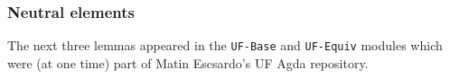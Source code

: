 \subsubsection{Neutral elements}\label{neutral-elements}
The next three lemmas appeared in the \texttt{UF-Base} and \texttt{UF-Equiv} modules which were (at one time) part of Matin Escsardo's UF Agda repository.
\ccpad
\begin{code}%
\>[0]\<%
\\
\>[0]\AgdaSpace{}%
\AgdaSymbol{:}\AgdaSpace{}%
\AgdaSymbol{\{}\AgdaSpace{}%
\AgdaSymbol{:}\AgdaSpace{}%
\AgdaSymbol{\}}\AgdaSpace{}%
\AgdaSymbol{\{}\AgdaSpace{}%
\AgdaSymbol{:}\AgdaSpace{}%
\AgdaSpace{}%
\AgdaSpace{}%
\AgdaSymbol{\}}\AgdaSpace{}%
\AgdaSymbol{\{}\AgdaSpace{}%
\AgdaSpace{}%
\AgdaSymbol{:}\AgdaSpace{}%
\AgdaSymbol{\}}\AgdaSpace{}%
\AgdaSymbol{(}\AgdaSpace{}%
\AgdaSymbol{:}\AgdaSpace{}%
\AgdaSpace{}%
\AgdaSpace{}%
\AgdaSymbol{)}\AgdaSpace{}%
\AgdaSpace{}%
\AgdaSymbol{(}\AgdaSpace{}%
\AgdaSymbol{\AgdaUnderscore{})}\AgdaSpace{}%
\AgdaSpace{}%
\AgdaSpace{}%
\AgdaSpace{}%
\<%
\\
\>[0]\AgdaSpace{}%
\AgdaSymbol{(}\AgdaSpace{}%
\AgdaSymbol{\AgdaUnderscore{})}\AgdaSpace{}%
\AgdaSymbol{=}\AgdaSpace{}%
\AgdaSpace{}%
\AgdaSymbol{\AgdaUnderscore{}}\<%
\\
%
\\[\AgdaEmptyExtraSkip]%
\>[0]\AgdaSpace{}%
\AgdaSymbol{:}\AgdaSpace{}%
\AgdaSymbol{\{}\AgdaSpace{}%
\AgdaSymbol{:}\AgdaSpace{}%
\AgdaSymbol{\}\{}\AgdaSpace{}%
\AgdaSymbol{:}\AgdaSpace{}%
\AgdaSpace{}%
\AgdaSpace{}%
\AgdaSymbol{\}}\AgdaSpace{}%
\AgdaSymbol{\{}\AgdaSpace{}%
\AgdaSpace{}%
\AgdaSymbol{:}\AgdaSpace{}%
\AgdaSymbol{\}}\AgdaSpace{}%
\AgdaSymbol{(}\AgdaSpace{}%
\AgdaSymbol{:}\AgdaSpace{}%
\AgdaSpace{}%
\AgdaSpace{}%
\AgdaSymbol{)}\AgdaSpace{}%
\AgdaSpace{}%
\AgdaSpace{}%
\AgdaSpace{}%

\end{code}

